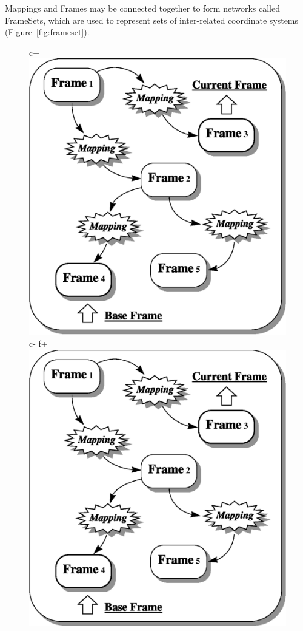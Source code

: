 \documentclass[twoside,11pt]{article}
\newenvironment{latexonly}{}{}
\begin{document}
\begin{latexonly}
   Mappings and Frames may be connected together to form networks called
   FrameSets, which are used to represent sets of inter-related
   coordinate systems (Figure~\ref{fig:frameset}).
   \begin{figure}
   \begin{center}
c+
   \includegraphics[scale=0.75]{sun211_figures/frameset.eps}
c-
f+
   \includegraphics[scale=0.75]{sun210_figures/frameset.eps}

\end{center}
\end{figure}
\end{latexonly}
\end{document}
